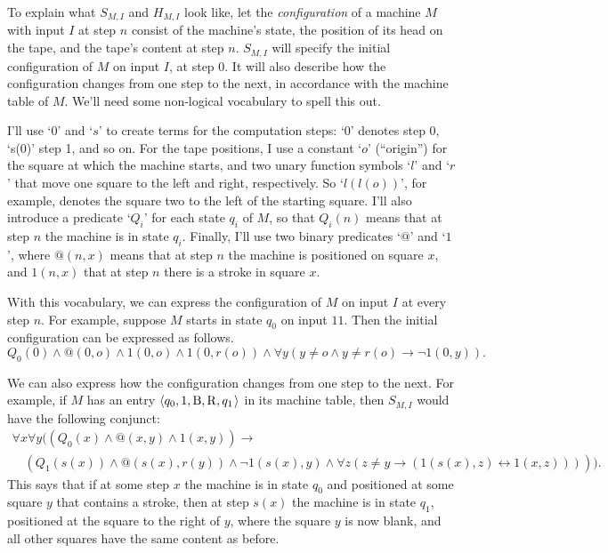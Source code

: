 To explain what $S_{M,I}$ and $H_{M,I}$ look like,
let the \emph{configuration} of a machine $M$ with input $I$ at step $n$ consist of
the machine's state, the position of its head on the tape, and the tape's content at step $n$.
$S_{M,I}$ will specify the initial configuration of $M$ on input $I$, at step 0.
It will also describe how the configuration changes from one step to the next,
in accordance with the machine table of $M$.
We'll need some non-logical vocabulary to spell this out.

I'll use `$0$' and `$s$' to create
terms for the computation steps:
`$0$' denotes step 0, `s(0)' step 1, and so on.
For the tape positions,
I use a constant `$o$' (``origin'') for the square at which the machine starts,
and two unary function symbols `$l$' and `$r$'
that move one square to the left and right, respectively.
So `$l(l(o))$', for example, denotes the square two to the left of the starting square.
I'll also introduce a predicate `$Q_{i}$' for each state $q_{i}$ of $M$,
so that $Q_{i}(n)$ means that at step $n$ the machine is in state $q_{i}$.
Finally,
I'll use two binary predicates `$@$' and `$1$',
where $@(n,x)$ means that at step $n$ the machine is positioned on square $x$,
and $1(n,x)$ that at step $n$ there is a stroke in square $x$.

With this vocabulary,
we can express the configuration of $M$ on input $I$ at every step $n$.
For example, suppose $M$ starts in state $q_{0}$ on input $11$.
Then the initial configuration can be expressed as follows.
\[
  Q_0(0) \land @(0,o) \land 1(0,o) \land 1(0,r(o)) \land \forall y(y \neq o \land y \neq r(o) \to \neg 1(0,y)).
\]

We can also express how the configuration changes from one step to the next.
For example,
if $M$ has an entry $\t{q_{0}, 1, \mathrm{B}, \mathrm{R}, q_{1}}$ in its machine table,
then $S_{M,I}$ would have the following conjunct:
\begin{multline*}
  \forall x \forall y((Q_0(x) \land @(x,y) \land 1(x,y)) \to \\
  \quad (Q_1(s(x)) \land @(s(x),r(y)) \land \neg 1(s(x),y) \land \forall z(z \neq y \to (1(s(x),z) \leftrightarrow 1(x,z))) )).
\end{multline*}
This says that
if at some step $x$ the machine is in state $q_{0}$ and positioned at some square $y$ that contains a stroke,
then at step $s(x)$ the machine is in state $q_{1}$,
positioned at the square to the right of $y$,
where the square $y$ is now blank,
and all other squares have the same content as before.

